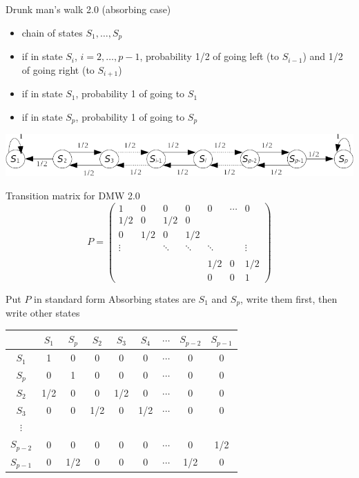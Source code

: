 \documentclass[aspectratio=169]{beamer}
\begin{document}
\begin{frame}{Drunk man's walk 2.0 (absorbing case)}
    \begin{itemize}
        \item chain of states $S_1,\ldots,S_p$
        \item if in state $S_i$, $i=2,\ldots,p-1$, probability 1/2 of going left (to $S_{i-1}$) and 1/2 of going right (to $S_{i+1}$)
        \item if in state $S_1$, probability 1 of going to $S_1$
        \item if in state $S_p$, probability 1 of going to $S_p$
    \end{itemize}
    \vfill
\begin{center}
    \includegraphics[width=\textwidth]{FIGS/drunk_mans_walk_absorbing}
\end{center}
\end{frame}


\begin{frame}{Transition matrix for DMW 2.0}
    $$
    P=\begin{pmatrix}
    1 & 0 & 0 & 0 & 0 & \cdots & 0\\
    1/2 & 0 & 1/2 & 0 & & & \\
    0 & 1/2 & 0 & 1/2 & & & \\
    \vdots & & \ddots & \ddots & \ddots & & \vdots \\
    & & & & & & \\
    & & & & 1/2 & 0 & 1/2 \\
    & & & & 0 & 0 & 1
    \end{pmatrix}
    $$    
\end{frame}


\begin{frame}{Put $P$ in standard form}
    Absorbing states are $S_1$ and $S_p$, write them first, then write other states

    \begin{center}
        \begin{tabular}{c|cccccccc}
            & $S_1$ & $S_p$ & $S_2$ & $S_3$ & $S_4$ & $\cdots$ & $S_{p-2}$ & $S_{p-1}$ \\
            \hline 
            $S_1$ & 1 & 0 & 0 & 0 & 0 & $\cdots$ & 0 & 0 \\
            $S_p$ & 0 & 1 & 0 & 0 & 0 & $\cdots$ & 0 & 0 \\
            $S_2$ & 1/2 & 0 & 0 & 1/2 & 0 & $\cdots$ & 0 & 0 \\
            $S_3$ & 0 & 0 & 1/2 & 0 & 1/2 & $\cdots$ & 0 & 0 \\
            $\vdots$ &  &  &  &  & & & & \\
            $S_{p-2}$ & 0 & 0 & 0 & 0 & 0 & $\cdots$ & 0 & 1/2 \\
            $S_{p-1}$ & 0 & 1/2 & 0 & 0 & 0 & $\cdots$ & 1/2 & 0                 
        \end{tabular}
    \end{center}
\end{frame}
\end{document}
